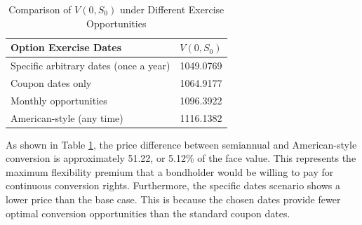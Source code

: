 \begin{table}[h!]
    \centering
    \begin{tabular}{lc}
        \toprule
        Option Exercise Dates & \( V(0, S_0) \) \\
        \midrule
        Specific arbitrary dates (once a year) & 1049.0769 \\
        Coupon dates only         & 1064.9177 \\
        Monthly opportunities     & 1096.3922 \\
        American-style (any time)           & 1116.1382 \\
        \bottomrule
    \end{tabular}
    \caption{Comparison of \( V(0, S_0) \) under Different Exercise Opportunities}
    \label{tab:bond_valuation}
\end{table}

As shown in Table \ref{tab:bond_valuation}, the price difference between semiannual and American-style conversion is approximately 51.22, or 5.12\% of the face value. This represents the maximum flexibility premium that a bondholder would be willing to pay for continuous conversion rights. Furthermore, the specific dates scenario shows a lower price than the base case. This is because the chosen dates provide fewer optimal conversion opportunities than the standard coupon dates.


